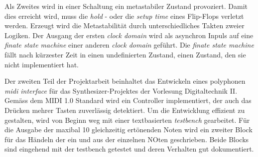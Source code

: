 Als Zweites wird in einer Schaltung ein metastabiler Zustand provoziert. Damit dies erreicht wird, muss die \textit{hold} - oder die\textit{ setup time} eines Flip-Flops verletzt werden. Erzeugt wird die Metastabilität durch unterschiedliches Takten zweier Logiken. Der Ausgang der ersten \textit{clock domain} wird als asynchron Inpuls auf eine \textit{finate state machine} einer anderen \textit{clock domain} geführt. Die \textit{finate state machine} fällt nach kürzester Zeit in einen undefinierten Zustand, einen Zustand, den sie nicht implementiert hat.



Der zweiten Teil der Projektarbeit beinhaltet das Entwickeln eines polyphonen \textit{midi interface} für das Synthesizer-Projektes der Vorlesung Digitaltechnik II. Gemäss dem MIDI 1.0 Standard wird ein Controller implementiert, der auch das Drücken mehrer Tasten zuverlässig detektiert. Um die Entwicklung effizient zu gestalten, wird von Beginn weg mit einer textbasierten \textit{testbench} gearbeitet. 
Für die Ausgabe der maxibal 10 gleichzeitig ertönenden Noten wird ein zweiter Block für das Händeln der ein und aus der einzelnen NOten geschrieben. Beide Blocks sind eingehend mit der testbench getestet und deren Verhalten gut dokumentiert.

